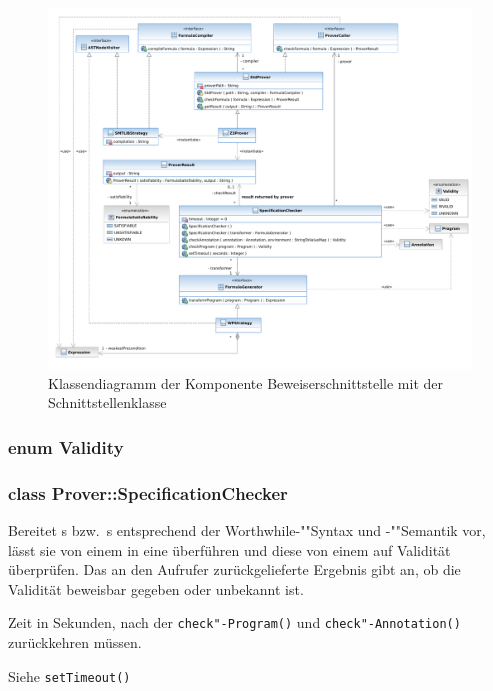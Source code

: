 \begin{figure}[p]%
    \hspace{-4cm}%
    \includegraphics[width=1.5\textwidth]{diagrams/prover_component.pdf}%

    \caption{Klassendiagramm der Komponente Beweiserschnittstelle mit
    der Schnittstellenklasse }%

\end{figure}%

\subsubsection{enum Validity}%

\subsubsection{class Prover::SpecificationChecker}%


Bereitet s bzw.\ s entsprechend der
Worthwhile-""Syntax und -""Semantik vor, lässt sie von einem
 in eine  überführen und diese
von einem  auf Validität überprüfen. Das an den
Aufrufer zurückgelieferte Ergebnis gibt an, ob die Validität beweisbar
gegeben oder unbekannt ist.%


\begin{description}%

    Zeit in Sekunden, nach der \texttt{check"-Program()} und
    \texttt{check"-Annotation()} zurückkehren müssen.%

    Siehe \texttt{setTimeout()}%




\end{description}%

